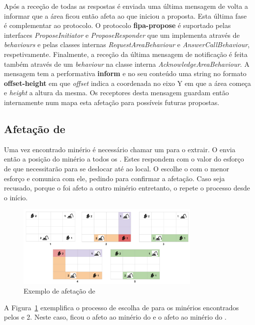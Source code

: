 \documentclass[12pt]{report}
\begin{document}
Após a receção de todas as respostas é enviada uma última mensagem de volta a informar que a área ficou então afeta ao \spotter que iniciou a proposta. Esta última fase é complementar ao protocolo.
O protocolo \textbf{fipa-propose} é suportado pelas interfaces \emph{ProposeInitiator} e \emph{ProposeResponder} que um \spotter implementa através de \emph{behaviours} e pelas classes internas 
\emph{RequestAreaBehaviour} e \emph{AnswerCallBehaviour}, respetivamente.
Finalmente, a receção da última mensagem de notificação é feita também através de um \emph{behaviour} na classe interna \emph{AcknowledgeAreaBehaviour}. A mensagem tem a performativa \textbf{inform} e
no seu conteúdo uma string no formato \textbf{offset-height} em que \emph{offset} indica a coordenada no eixo Y em que a área começa e \emph{height} a altura da mesma. Os receptores desta mensagem
guardam então internamente num mapa esta afetação para possíveis futuras propostas.

\FloatBarrier
\subsection{Afetação de \producers}
Uma vez encontrado minério é necessário chamar um \producer para o extrair. O \spotter envia então a posição do  minério a todos os \producers. 
Estes respondem com o valor do esforço de que necessitarão para se deslocar até ao local. 
O \spotter escolhe o \producer com o menor esforço e comunica com ele, pedindo para confirmar a afetação. 
Caso seja recusado, porque o \producer foi afeto a outro minério entretanto, o \spotter repete o processo desde o início.

\begin{figure}[h]
	\centering
    \includegraphics[width=0.8\textwidth]{producer-scheduling}
	\caption{Exemplo de afetação de \producers}
	\label{producer-scheduling}
\end{figure}

A Figura~\ref{producer-scheduling} exemplifica o processo de escolha de \producers para os minérios encontrados pelos  e 2. 
Neste caso, ficou o  afeto ao minério do  e o  afeto ao minério do .
\end{document}

